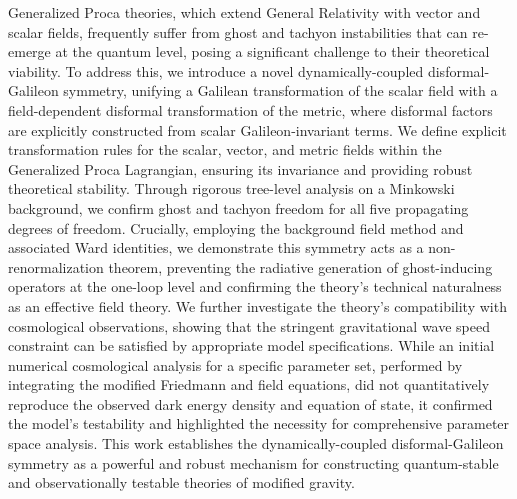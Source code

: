 \documentclass[twocolumn]{aastex631}
\begin{document}
Generalized Proca theories, which extend General Relativity with vector and scalar fields, frequently suffer from ghost and tachyon instabilities that can re-emerge at the quantum level, posing a significant challenge to their theoretical viability. To address this, we introduce a novel dynamically-coupled disformal-Galileon symmetry, unifying a Galilean transformation of the scalar field with a field-dependent disformal transformation of the metric, where disformal factors are explicitly constructed from scalar Galileon-invariant terms. We define explicit transformation rules for the scalar, vector, and metric fields within the Generalized Proca Lagrangian, ensuring its invariance and providing robust theoretical stability. Through rigorous tree-level analysis on a Minkowski background, we confirm ghost and tachyon freedom for all five propagating degrees of freedom. Crucially, employing the background field method and associated Ward identities, we demonstrate this symmetry acts as a non-renormalization theorem, preventing the radiative generation of ghost-inducing operators at the one-loop level and confirming the theory's technical naturalness as an effective field theory. We further investigate the theory's compatibility with cosmological observations, showing that the stringent gravitational wave speed constraint can be satisfied by appropriate model specifications. While an initial numerical cosmological analysis for a specific parameter set, performed by integrating the modified Friedmann and field equations, did not quantitatively reproduce the observed dark energy density and equation of state, it confirmed the model's testability and highlighted the necessity for comprehensive parameter space analysis. This work establishes the dynamically-coupled disformal-Galileon symmetry as a powerful and robust mechanism for constructing quantum-stable and observationally testable theories of modified gravity.
\end{document}
